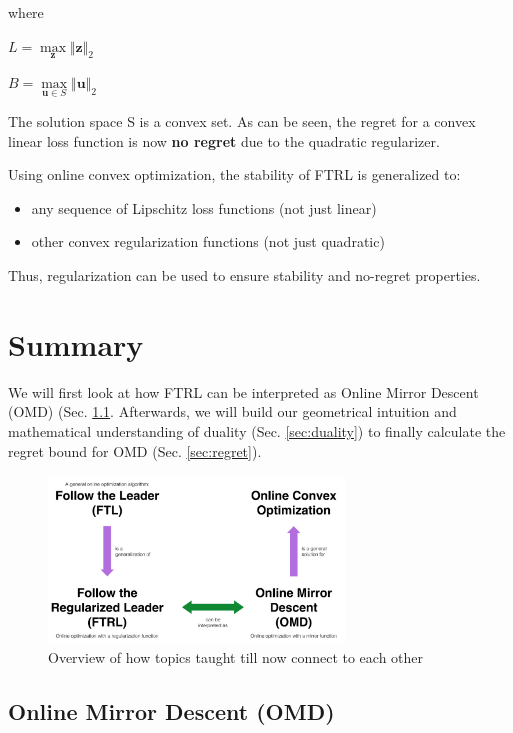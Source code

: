 \documentclass[11pt]{article}
\begin{document}
where

\centerline{$L = \max\limits_{\textbf{z}} \Vert \textbf{z} \Vert_2$}

\centerline{$B = \max\limits_{\textbf{u} \in S} \Vert \textbf{u} \Vert_2$}

The solution space S is a convex set. As can be seen, the regret for a convex linear loss function is now \textbf{no regret} due to the quadratic regularizer.

Using online convex optimization, the stability of FTRL is generalized to:

\begin{itemize}
    \item any sequence of Lipschitz loss functions (not just linear)
    \item other convex regularization functions (not just quadratic)
\end{itemize}

Thus, regularization can be used to ensure stability and no-regret properties.

\section{Summary}
We will first look at how FTRL can be interpreted as Online Mirror Descent (OMD) (Sec. \ref{sec:omd}. Afterwards, we will build our geometrical intuition and mathematical understanding of duality (Sec. \ref{sec:duality}) to finally calculate the regret bound for OMD (Sec. \ref{sec:regret}).

\begin{figure}[H]
    \centering
    \includegraphics[width=0.7\textwidth]{figs/chart.png}
    \caption{Overview of how topics taught till now connect to each other}
    \label{fig:chart}
\end{figure}

\subsection{Online Mirror Descent (OMD)}
\label{sec:omd}
\end{document}

